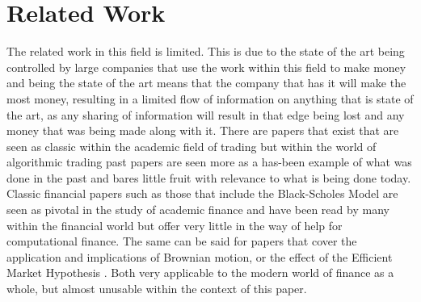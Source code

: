 \documentclass[conference]{IEEEtran}
\begin{document}
\iffalse
#################################################################################
\fi

\section{Related Work}

\iffalse
This section presents a survey of existing work on the problems that this project addresses.  it should be between 2 to 4 pages in length.  The rest of this section shows the formats of subsections as well as some general formatting information for tables, figures, references and equations.
\fi

\iffalse
The related work in this field is limited. This is due to the state of the art being controlled by large companies that use the work within this field to make money and being the state of the art means that the company that has it will make the most money, resulting in a limited flow of information on anything that is state of the art, as any sharing of information will result in that edge being lost and any money that was being made along with it. There are papers that exist that are seen as classic within the academic field of trading but within the world of algorithmic trading past papers are seen more as a has-been example of what was done in the past and bares little fruit with relevance to what is being done today. \\

Classic financial papers such as those that include the Black-Scholes Model \cite{Saad2015} are seen as pivotal in the study of academic finance and have been read by many within the financial world but offer very little in the way of help for computational finance. The same can be said for papers that cover the application and implications of Brownian motion, or the effect of the Efficient Market Hypothesis \cite{Meng2016}. Both very applicable to the modern world of finance as a whole, but almost unusable within the context of this paper. \\
\end{document}
